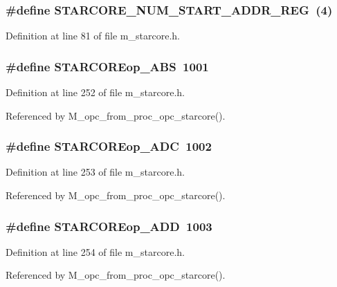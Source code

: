 \subsubsection{\setlength{\rightskip}{0pt plus 5cm}\#define STARCORE\_\-NUM\_\-START\_\-ADDR\_\-REG~(4)}\label{m__starcore_8h_d41ca2f8443e75366d37cff78e6daebe}




Definition at line 81 of file m\_\-starcore.h.
\subsubsection{\setlength{\rightskip}{0pt plus 5cm}\#define STARCOREop\_\-ABS~1001}\label{m__starcore_8h_1cdb7f3e3012ae473b79aacaed9a6a06}




Definition at line 252 of file m\_\-starcore.h.

Referenced by M\_\-opc\_\-from\_\-proc\_\-opc\_\-starcore().
\subsubsection{\setlength{\rightskip}{0pt plus 5cm}\#define STARCOREop\_\-ADC~1002}\label{m__starcore_8h_d2e182b52178939fd64ff88187ac8dd1}




Definition at line 253 of file m\_\-starcore.h.

Referenced by M\_\-opc\_\-from\_\-proc\_\-opc\_\-starcore().
\subsubsection{\setlength{\rightskip}{0pt plus 5cm}\#define STARCOREop\_\-ADD~1003}\label{m__starcore_8h_f138b84dd649dbae7904dc6e2437bfe7}




Definition at line 254 of file m\_\-starcore.h.

Referenced by M\_\-opc\_\-from\_\-proc\_\-opc\_\-starcore().
